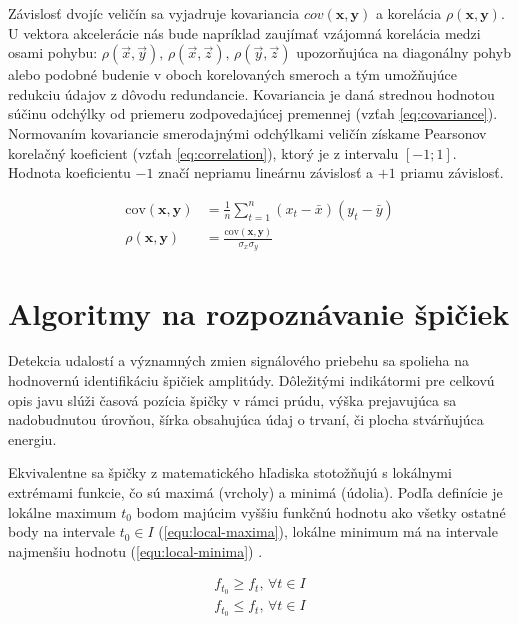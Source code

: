 Závislosť dvojíc veličín sa vyjadruje kovariancia $cov(\mathbf{x}, \mathbf{y})$ a korelácia
$\rho(\mathbf{x}, \mathbf{y})$. U vektora akcelerácie nás bude napríklad zaujímať vzájomná korelácia medzi
osami pohybu: $\rho(\vec{x},\vec{y}),\, \rho(\vec{x},\vec{z}),\, \rho(\vec{y},\vec{z})$ upozorňujúca na diagonálny
pohyb alebo podobné budenie v oboch korelovaných smeroch a tým umožňujúce redukciu údajov z dôvodu redundancie.
Kovariancia je daná strednou hodnotou súčinu odchýlky od priemeru zodpovedajúcej premennej (vzťah \ref{eq:covariance}).
Normovaním kovariancie smerodajnými odchýlkami veličín získame Pearsonov korelačný koeficient
(vzťah \ref{eq:correlation}), ktorý je z intervalu $[-1; 1]$.  Hodnota koeficientu $-1$ značí nepriamu lineárnu závislosť
a $+1$ priamu závislosť.
\begin{ceqn}\begin{align}
\mathrm{cov}(\mathbf{x}, \mathbf{y}) &= \frac{1}{n} \sum_{t=1}^{n}{(x_t - \bar{x})(y_t - \bar{y})} \label{eq:covariance} \\
\rho(\mathbf{x}, \mathbf{y}) &= \frac{\mathrm{cov}(\mathbf{x}, \mathbf{y})}{\sigma_x \sigma_y} \label{eq:correlation}
\end{align}\end{ceqn}

\section{Algoritmy na rozpoznávanie špičiek}
\label{peak-detection}
Detekcia udalostí a významných zmien signálového priebehu sa spolieha na hodnovernú identifikáciu špičiek amplitúdy.
Dôležitými indikátormi pre celkovú opis javu slúži časová pozícia špičky v rámci prúdu, výška prejavujúca
sa nadobudnutou úrovňou, šírka obsahujúca údaj o trvaní, či plocha stvárňujúca energiu.

Ekvivalentne sa špičky z matematického hľadiska stotožňujú s lokálnymi extrémami funkcie, čo sú maximá (vrcholy) a minimá (údolia).
Podľa definície je lokálne maximum $t_0$ bodom majúcim vyššiu funkčnú hodnotu ako všetky ostatné body na intervale
$t_0 \in I$ (\ref{equ:local-maxima}), lokálne minimum má na intervale najmenšiu hodnotu (\ref{equ:local-minima})
\cite{survey-peaks-valleys}.
\begin{ceqn}\begin{align}
f_{t_0} \geq f_t,\, \forall t \in I \label{equ:local-maxima}\\
f_{t_0} \leq f_t,\, \forall t \in I \label{equ:local-minima}
\end{align}\end{ceqn}

